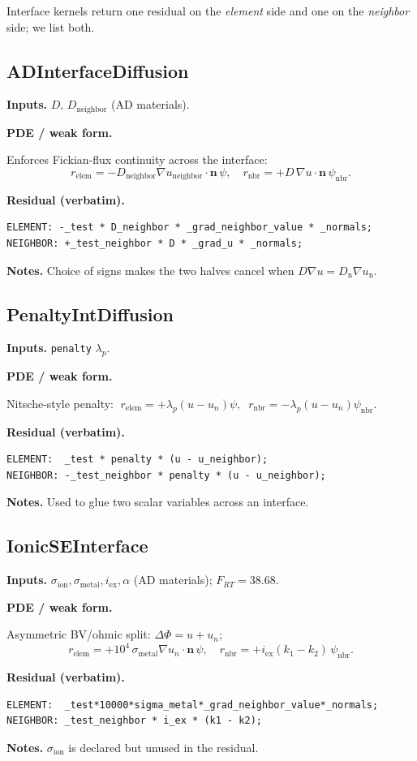 \documentclass[11pt]{article}
\newcommand{\nvec}{\mathbf{n}}
\newenvironment{ecmEntry}[1]{%
  \subsection{#1}%
}{}
\newcommand{\inputsRow}[1]{\par\noindent\textbf{Inputs.} #1\par}
\newcommand{\pdeRow}[1]{\par\noindent\textbf{PDE / weak form.}\par #1\par}
\newcommand{\codeRow}{\par\noindent\textbf{Residual (verbatim).}\par}
\newcommand{\notesRow}[1]{\par\noindent\textbf{Notes.} #1\par}
\begin{document}
Interface kernels return one residual on the \emph{element} side and one on the
\emph{neighbor} side; we list both.

\begin{ecmEntry}{ADInterfaceDiffusion}
\inputsRow{$D,\,D_{\text{neighbor}}$ (AD materials).}
\pdeRow{Enforces Fickian-flux continuity across the interface:
\[
  r_{\text{elem}} = -D_{\text{neighbor}}\nabla u_{\text{neighbor}}\cdot\nvec\,\psi,\quad
  r_{\text{nbr}}  = +D\,\nabla u\cdot\nvec\,\psi_{\text{nbr}}.
\]}
\codeRow\begin{lstlisting}
ELEMENT: -_test * D_neighbor * _grad_neighbor_value * _normals;
NEIGHBOR: +_test_neighbor * D * _grad_u * _normals;
\end{lstlisting}
\notesRow{Choice of signs makes the two halves cancel when $D\nabla u = D_{\text{n}}\nabla u_{\text{n}}$.}
\end{ecmEntry}

\begin{ecmEntry}{PenaltyIntDiffusion}
\inputsRow{\texttt{penalty} $\lambda_p$.}
\pdeRow{Nitsche-style penalty: $\;r_{\text{elem}} = +\lambda_p(u-u_n)\psi,\;\;
r_{\text{nbr}} = -\lambda_p(u-u_n)\psi_{\text{nbr}}$.}
\codeRow\begin{lstlisting}
ELEMENT:  _test * penalty * (u - u_neighbor);
NEIGHBOR: -_test_neighbor * penalty * (u - u_neighbor);
\end{lstlisting}
\notesRow{Used to glue two scalar variables across an interface.}
\end{ecmEntry}

\begin{ecmEntry}{IonicSEInterface}
\inputsRow{$\sigma_{\text{ion}},\sigma_{\text{metal}},i_{\text{ex}},\alpha$ (AD materials);
$F_{RT}=38.68$.}
\pdeRow{Asymmetric BV/ohmic split:
$\Delta\Phi = u + u_n;$
\[
 r_{\text{elem}} = +10^4\,\sigma_{\text{metal}}\nabla u_n\!\cdot\!\nvec\,\psi,\quad
 r_{\text{nbr}}  = +i_{\text{ex}}(k_1-k_2)\,\psi_{\text{nbr}}.
\]}
\codeRow\begin{lstlisting}
ELEMENT:  _test*10000*sigma_metal*_grad_neighbor_value*_normals;
NEIGHBOR: _test_neighbor * i_ex * (k1 - k2);
\end{lstlisting}
\notesRow{$\sigma_{\text{ion}}$ is declared but unused in the residual.}
\end{ecmEntry}
\end{document}
